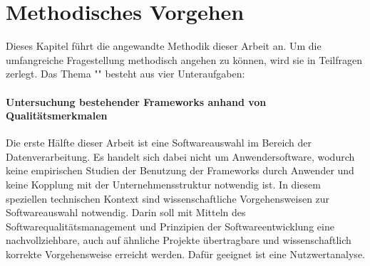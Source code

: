\chapter{Methodisches Vorgehen}
\label{chapter:methodik}

Dieses Kapitel führt die angewandte Methodik dieser Arbeit an.
Um die umfangreiche Fragestellung methodisch angehen zu können, wird sie in Teilfragen zerlegt.
Das Thema "\titel{}" besteht aus vier Unteraufgaben:

\subsubsection{Untersuchung bestehender Frameworks anhand von Qualitätsmerkmalen}
Die erste Hälfte dieser Arbeit ist eine Softwareauswahl im Bereich der Datenverarbeitung.
Es handelt sich dabei nicht um Anwendersoftware, wodurch keine empirischen Studien der Benutzung der Frameworks durch Anwender und keine Kopplung mit der Unternehmensstruktur notwendig ist.
In diesem speziellen technischen Kontext sind wissenschaftliche Vorgehensweisen zur Softwareauswahl notwendig.
Darin soll mit Mitteln des Softwarequalitätsmanagement und Prinzipien der Softwareentwicklung eine nachvollziehbare, auch auf ähnliche Projekte übertragbare und wissenschaftlich korrekte Vorgehensweise erreicht werden.
Dafür geeignet ist eine Nutzwertanalyse.

